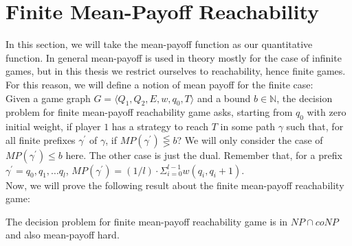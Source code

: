 \section{Finite Mean-Payoff Reachability}
In this section, we will take the mean-payoff function as our quantitative function. In general mean-payoff is used in theory mostly for the case of infinite games, but in this thesis we restrict ourselves to reachability, hence finite games. For this reason, we will define a notion of mean payoff for the finite case:\\
\vskip 0.5cm
Given a game graph $G=\langle Q_1, Q_2, E, w, q_0,T\rangle$ and a bound $b \in \mathbb{N}$, the decision problem for finite mean-payoff reachability game asks, starting from $q_0$ with zero initial weight, if player $1$ has a strategy to reach $T$ in some path $\gamma$ such that, for all finite prefixes $\gamma^{\prime}$ of $\gamma$, if $MP(\gamma^{\prime}) \lesseqgtr b$? We will only consider the case of  $MP(\gamma^{\prime}) \leq b$ here. The other case is just the dual. Remember that, for a prefix $\gamma^{\prime}= q_0,q_1,\ldots q_l$, $MP(\gamma^{\prime})= (1/l) \cdot \Sigma_{i=0}^{l-1} w(q_i,q_i+1)$.\\ Now, we will prove the following result about the finite mean-payoff reachability game:\\
\begin{theorem}
\label{fin-meanpayoff-thm}
The decision problem for finite mean-payoff reachability game is in $NP \cap coNP$ and also mean-payoff hard. 
\end{theorem}
